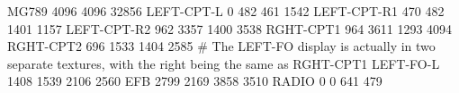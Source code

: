MG789 4096 4096 32856
LEFT-CPT-L     0  482  461 1542
LEFT-CPT-R1   470  482 1401 1157
LEFT-CPT-R2 962 3357 1400 3538
RGHT-CPT1  964 3611 1293 4094
RGHT-CPT2  696 1533 1404 2585
# The LEFT-FO display is actually in two separate textures, with the right being the same as RGHT-CPT1
LEFT-FO-L 1408 1539 2106 2560
EFB       2799 2169 3858 3510
RADIO     0 0 641 479
